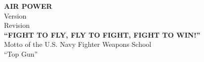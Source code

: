 \thispagestyle{empty}

\begin{minipage}{\linewidth}
\begin{center}
{\LARGE \textbf{AIR POWER}}\\
\vspace{3ex}
Version \thisversion\\[\smallskipamount]
Revision \thisrevision\\
\vspace{3ex}
\textbf{“FIGHT TO FLY, FLY TO FIGHT, FIGHT TO WIN!”}\\
\vspace{1ex}
Motto of the U.S. Navy Fighter Weapons School\\
\vspace{1ex}
“Top Gun”
\end{center}
\vspace{1ex}
\end{minipage}

